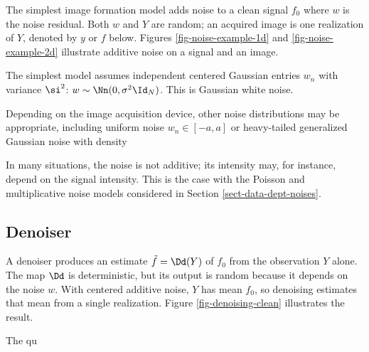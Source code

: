 The simplest image formation model adds noise to a clean signal $f_0$
where $w$ is the noise residual. Both $w$ and $Y$ are random; an acquired image is one realization of $Y$, denoted by $y$ or $f$ below. Figures \ref{fig-noise-example-1d} and \ref{fig-noise-example-2d} illustrate additive noise on a signal and an image.




The simplest model assumes independent centered Gaussian entries $w_n$ with variance $\si^2$: $w\sim\Nn(0,\sigma^2\Id_N)$. This is Gaussian white noise.

Depending on the image acquisition device, other noise distributions may be appropriate, including uniform noise $w_n \in [-a,a]$ or heavy-tailed generalized Gaussian noise with density

In many situations, the noise is not additive; its intensity may, for instance, depend on the signal intensity. This is the case with the Poisson and multiplicative noise models considered in Section \ref{sect-data-dept-noises}.


                                                     
\subsection{Denoiser}

A denoiser produces an estimate $\tilde f = \Dd(Y)$ of $f_0$ from the observation $Y$ alone. The map $\Dd$ is deterministic, but its output is random because it depends on the noise $w$. With centered additive noise, $Y$ has mean $f_0$, so denoising estimates that mean from a single realization. Figure \ref{fig-denoising-clean} illustrates the result.

The qu